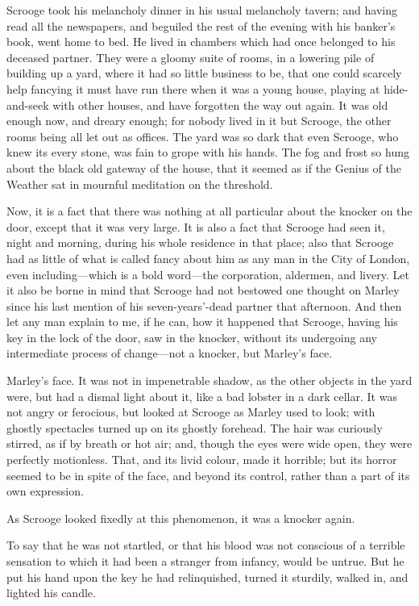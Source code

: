 \documentclass[paper=a5,BCOR=15mm,twoside,DIV=15,headinclude=off,12pt,chapterprefix=off,openany,headings=huge]{scrbook} %
\begin{document}
Scrooge took his melancholy dinner in his usual melancholy tavern; and having read all the newspapers, and beguiled the rest of the evening with his banker's book, went home to bed. He lived in chambers which had once belonged to his deceased partner. They were a gloomy suite of rooms, in a lowering pile of building up a yard, where it had so little business to be, that one could scarcely help fancying it must have run there when it was a young house, playing at hide-and-seek with other houses, and have forgotten the way out again. It was old enough now, and dreary enough; for nobody lived in it but Scrooge, the other rooms being all let out as offices. The yard was so dark that even Scrooge, who knew its every stone, was fain to grope with his hands. The fog and frost so hung about the black old gateway of the house, that it seemed as if the Genius of the Weather sat in mournful meditation on the threshold.

Now, it is a fact that there was nothing at all particular about the knocker on the door, except that it was very large. It is also a fact that Scrooge had seen it, night and morning, during his whole residence in that place; also that Scrooge had as little of what is called fancy about him as any man in the City of London, even including—which is a bold word—the corporation, aldermen, and livery. Let it also be borne in mind that Scrooge had not bestowed one thought on Marley since his last mention of his seven-years'-dead partner that afternoon. And then let any man explain to me, if he can, how it happened that Scrooge, having his key in the lock of the door, saw in the knocker, without its undergoing any intermediate process of change—not a knocker, but Marley's face.

Marley's face. It was not in impenetrable shadow, as the other objects in the yard were, but had a dismal light about it, like a bad lobster in a dark cellar. It was not angry or ferocious, but looked at Scrooge as Marley used to look; with ghostly spectacles turned up on its ghostly forehead. The hair was curiously stirred, as if by breath or hot air; and, though the eyes were wide open, they were perfectly motionless. That, and its livid colour, made it horrible; but its horror seemed to be in spite of the face, and beyond its control, rather than a part of its own expression.

As Scrooge looked fixedly at this phenomenon, it was a knocker again.

To say that he was not startled, or that his blood was not conscious of a terrible sensation to which it had been a stranger from infancy, would be untrue. But he put his hand upon the key he had relinquished, turned it sturdily, walked in, and lighted his candle.
\end{document}
